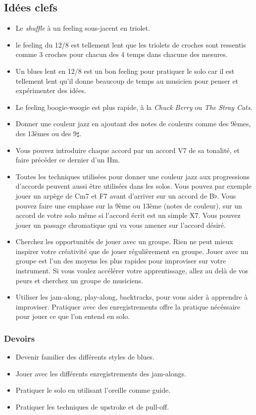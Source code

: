 \documentclass[a4paper]{book}
\begin{document}
\subsection{Idées clefs}
\begin{itemize}
\item Le \emph{shuffle} à un feeling sous-jacent en triolet.
\item le feeling du 12/8 est tellement lent que les triolets de croches sont ressentis comme 3 croches pour chacun des 4 temps dans chacune des mesures.
\item Un blues lent en 12/8 est un bon feeling pour pratiquer le solo car il est tellement lent qu'il donne beaucoup de temps au musicien pour penser et expérimenter des idées.
\item Le feeling boogie-woogie est plus rapide, à la \emph{Chuck Berry} ou \emph{The Stray Cats}.  
\item Donner une couleur jazz en ajoutant des notes de couleurs comme des 9èmes, des 13èmes ou des 9$\sharp$.
\item Vous pouvez introduire chaque accord par un accord V7 de sa tonalité, et faire précéder ce dernier d'un IIm.
\item Toutes les techniques utilisées pour donner une couleur jazz aux progressions d'accords peuvent aussi être utilisées dans les solos. Vous pouvez par exemple jouer un arpège de Cm7 et F7 avant d'arriver sur un accord de B$\flat$. Vous pouvez faire une emphase sur la 9ème ou 13ème (notes de couleur), sur un accord de votre solo même si l'accord écrit est un simple X7. Vous pouvez jouer un passage chromatique qui va vous amener sur l'accord désiré.
\item Cherchez les opportunités de jouer avec un groupe. Rien ne peut mieux inspirer votre créativité que de jouer régulièrement en groupe. Jouer avec un groupe est l'un des moyens les plus rapides pour improviser sur votre instrument. Si vous voulez accélérer votre apprentissage, allez au delà de vos peurs et cherchez un groupe de musiciens.
\item Utiliser les jam-along, play-along, backtracks, pour vous aider à apprendre à improviser. Pratiquer avec des enregistrements offre la pratique nécéssaire pour jouer ce que l'on entend en solo.
\end{itemize}

\subsubsection{Devoirs}
\begin{itemize}
\item Devenir familier des différents styles de blues.
\item Jouer avec les différents enregistrements des jam-alongs.
\item Pratiquer le solo en utilisant l'oreille comme guide.
\item Pratiquer les techniques de upstroke et de pull-off.
\end{itemize}
\end{document}
